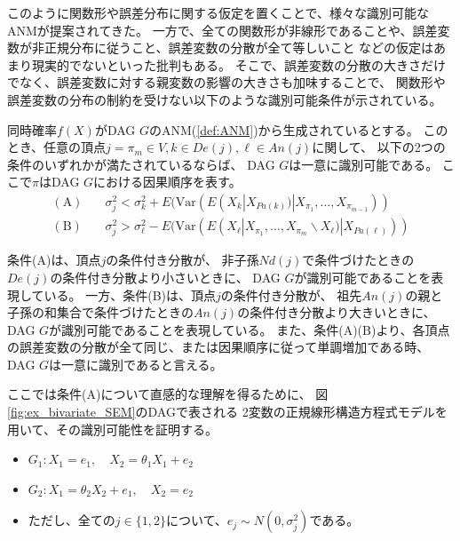 このように関数形や誤差分布に関する仮定を置くことで、様々な識別可能なANMが提案されてきた。
一方で、全ての関数形が非線形であることや、誤差変数が非正規分布に従うこと、誤差変数の分散が全て等しいこと
などの仮定はあまり現実的でないといった批判もある。
そこで、誤差変数の分散の大きさだけでなく、誤差変数に対する親変数の影響の大きさも加味することで、
関数形や誤差変数の分布の制約を受けない以下のような識別可能条件が示されている\cite{Park2020-ey}。

\begin{theo}
  同時確率$f(X)$がDAG $G$のANM(\ref{def:ANM})から生成されているとする。
  このとき、任意の頂点$j = \pi_m \in V, k \in De(j), \ell \in An(j)$に関して、
  以下の2つの条件のいずれかが満たされているならば、
  DAG $G$は一意に識別可能である。
  ここで$\pi$はDAG $G$における因果順序を表す。
  \begin{align*}
    (\text{A}) \quad &\sigma_j^2 < \sigma_k^2 + E(\mathrm{Var}(E(X_k | X_{Pa(k)}) | X_{\pi_1}, \dots, X_{\pi_{m-1}})) \\
    (\text{B}) \quad &\sigma_j^2 > \sigma_{\ell}^2 - E(\mathrm{Var}(E(X_{\ell} | X_{\pi_1}, \dots, X_{\pi_m} \backslash X_{\ell}) | X_{Pa(\ell)}))
  \end{align*}
\end{theo}

条件(A)は、頂点$j$の条件付き分散が、
非子孫$\mathit{Nd}(j)$で条件づけたときの$De(j)$の条件付き分散より小さいときに、
DAG $G$が識別可能であることを表現している。
一方、条件(B)は、頂点$j$の条件付き分散が、
祖先$An(j)$の親と子孫の和集合で条件づけたときの$An(j)$の条件付き分散より大きいときに、
DAG $G$が識別可能であることを表現している。
また、条件(A)(B)より、各頂点の誤差変数の分散が全て同じ、または因果順序に従って単調増加である時、
DAG $G$は一意に識別であると言える。

ここでは条件(A)について直感的な理解を得るために、
図\ref{fig:ex_bivariate_SEM}のDAGで表される
2変数の正規線形構造方程式モデルを用いて、その識別可能性を証明する。

\begin{itemize}
  \item
  $G_1 \colon X_1 = e_1,
   \quad X_2 = \theta_1 X_1 + e_2$

  \item
  $G_2 \colon X_1 = \theta_2 X_2 + e_1,
   \quad X_2 = e_2$

  \item
  ただし、全ての$j \in \{ 1,2 \}$について、$e_j \sim N(0, \sigma_j^2)$である。
\end{itemize}

